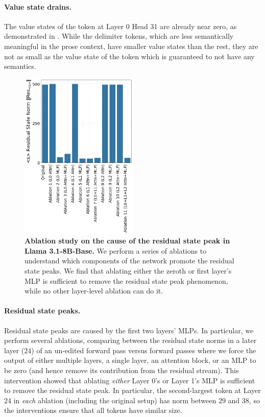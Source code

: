 \paragraph{Value state drains.} The value states of the \bos{} token at Layer \(0\) Head 31 are already near zero, as demonstrated in . While the delimiter tokens, which are less semantically meaningful in the prose context, have smaller value states than the rest, they are not as small as the value state of the \bos{} token which is guaranteed to not have any semantics.

\begin{figure}[h]
    \centering
    \includegraphics[width=0.5\textwidth]{Figures/llama_31_circuit/llama_31_massive_norms.png}
    \caption{\small\textbf{Ablation study on the cause of the residual state peak in Llama 3.1-8B-Base.} We perform a series of ablations to understand which components of the network promote the residual state peaks. We find that ablating either the zeroth or first layer's MLP is sufficient to remove the residual state peak phenomenon, while no other layer-level ablation can do it.}
    \label{fig:enter-label}
\end{figure}

\paragraph{Residual state peaks.} Residual state peaks are caused by the first two layers' MLPs. In particular, we perform several ablations, comparing between the residual state norms in a later layer (\(24\)) of an un-edited forward pass versus forward passes where we force the output of either multiple layers, a single layer, an attention block, or an MLP to be zero (and hence remove its contribution from the residual stream). This intervention showed that ablating \textit{either} Layer 0's or Layer 1's MLP is sufficient to remove the residual state peak. In particular, the second-largest token at Layer 24 in \textit{each} ablation (including the original setup) has norm between \(29\) and \(38\), so the interventions ensure that all tokens have similar size.

